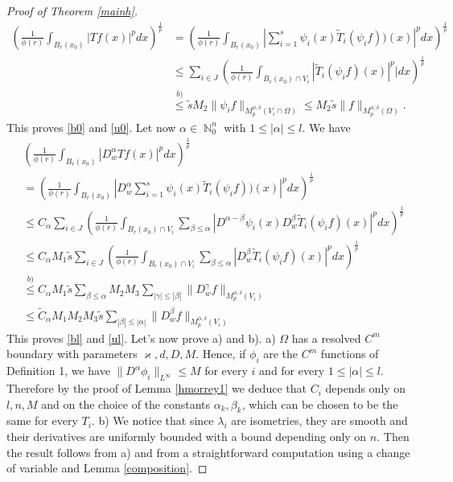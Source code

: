 \documentclass[12pt]{article}
\theoremstyle{definition}
\DeclareMathOperator\nn{\mathbb{N}}
\begin{document}
\begin{proof}[Proof of Theorem \ref{mainh}]
\begin{align*}
\left( \frac{1}{\phi(r)} \int_{B_r(x_0)} |Tf(x)|^pdx  \right)^{\frac{1}{p}} &=  \left( \frac{1}{\phi(r)} \int_{B_r(x_0)} |\sum_{i=1}^s \psi_i(x) \widetilde T_i(\psi_if))(x) |^pdx \right)^{\frac{1}{p}}\\
&\le \sum_{i \in J} \left( \frac{1}{\phi(r)} \int_{{B_r(x_0)} \cap V_i} | \widetilde T_i(\psi_if)(x)|^p |dx \right)^{\frac{1}{p}}\\
&\overset{b)}\le \widetilde s M_2\| \psi_i f\|_{M_p^{\phi,\delta}(V_i \cap \Omega)} \le M_2\widetilde s \| f\|_{M_p^{\phi,\delta}(\Omega)}.
\end{align*}
This proves \eqref{b0} and \eqref{u0}. Let now $\alpha \in \nn_0^n$ with $1\le|\alpha|\le l.$ We have 
\begin{align*}
&\left( \frac{1}{\phi(r)} \int_{B_r(x_0)} |D^\alpha_w Tf(x)|^pdx  \right)^{\frac{1}{p}} \\
&=  \left( \frac{1}{\phi(r)} \int_{B_r(x_0)} |D^\alpha_w \sum_{i=1}^s \psi_i(x) \widetilde T_i(\psi_if))(x) |^pdx \right)^{\frac{1}{p}}\\
&\le C_\alpha \sum_{i \in J} \left( \frac{1}{\phi(r)} \int_{{B_r(x_0)} \cap V_i} \sum_{\beta \le \alpha}|D^{\alpha -\beta}\psi_i(x) D^\beta_w \widetilde T_i(\psi_if)(x)|^p dx \right)^{\frac{1}{p}}\\
&\le C_\alpha M_1 \widetilde s \sum_{i \in J} \left( \frac{1}{\phi(r)} \int_{{B_r(x_0)} \cap V_i} \sum_{\beta \le \alpha}|D^\beta_w \widetilde T_i(\psi_if)(x)|^p dx \right)^{\frac{1}{p}}\\
&\overset{b)}\le C_\alpha M_1\widetilde s \sum_{\beta \le \alpha } M_2M_3 \sum_{|\gamma|\le |\beta|} \| D^\gamma_w f\|_{M_p^{\phi,\delta}(V_i)} \\
&  \le \widetilde C_\alpha M_1M_2M_3\widetilde s \sum_{|\beta| \le |\alpha|}\| D^\beta_w f\|_{M_p^{\phi,\delta}(V_i)} 
\end{align*}
This proves \eqref{bl} and \eqref{ul}. Let's now prove a) and b). a) $\Omega$ has a resolved $C^m$ boundary with parameters $\varkappa,d,D,M$. Hence, if $\phi_i$ are the $C^m$ functions of Definition 1, we have $\| D^{\alpha}\phi_i \|_{L^\infty}\le M$ for every $i$ and for every $1\le|\alpha|\le l$. Therefore by the proof of Lemma \ref{hmorrey1} we deduce that $C_i$ depends only on $l,n,M$ and on the choice of the constants $\alpha_k,\beta_k$, which can be chosen to be the same for every $T_i$.
b) We notice that since $\lambda_i$ are isometries, they are smooth and their derivatives are uniformly bounded with a bound depending only on $n$. Then the result follows from a) and from a straightforward computation using a change of variable and Lemma \ref{composition}.
\end{proof}
	
\end{document}

